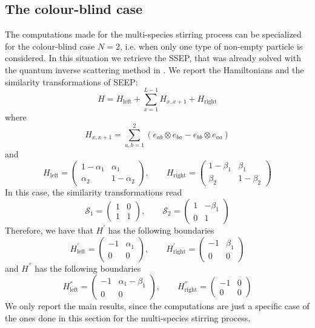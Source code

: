 \documentclass[10pt]{article}
\numberwithin{equation}{section}
\numberwithin{equation}{subsection}
\begin{document}
\subsection{The colour-blind case}
The computations made for the multi-species stirring process can be specialized for the colour-blind case $N=2$, i.e. when only one type of non-empty particle is considered. In this situation we retrieve the SSEP, that was already solved with the quantum inverse scattering method in \cite{frassek2020eigenstates}. We report the Hamiltonians and the similarity transformations of SEEP: 
\begin{equation}
	H=H_{\text{left}}+\sum_{x=1}^{L-1}H_{x,x+1}+H_{\text{right}}
\end{equation}
where 
\begin{equation}
	H_{x,x+1}=\sum_{a,b=1}^{2}\left(e_{ab}\otimes e_{ba}-e_{bb}\otimes e_{aa}\right)
\end{equation}
and 
\begin{equation}
	H_{\text{left}}=\begin{pmatrix}
		1-\alpha_{1}&\alpha_{1}\\
		\alpha_{2}&1-\alpha_{2}
	\end{pmatrix},\qquad H_{\text{right}}=\begin{pmatrix}
	1-\beta_{1}&\beta_{1}\\
	\beta_{2}&1-\beta_{2}
\end{pmatrix}
\end{equation}
In this case, the similarity transformations read
\begin{equation}
	\mathcal{S}_{1}=\begin{pmatrix}
		1&0\\
		1&1
	\end{pmatrix},\qquad \mathcal{S}_{2}=\begin{pmatrix}
	1&-\beta_{1}\\
	0&1
\end{pmatrix}
\end{equation}
Therefore, we have that $H^{'}$ has the following boundaries
\begin{equation}
	H^{'}_{\text{left}}=\begin{pmatrix}
		-1&\alpha_{1}\\
		0&0
	\end{pmatrix},\qquad H^{'}_{\text{right}}=\begin{pmatrix}
	-1&\beta_{1}\\
	0&0
\end{pmatrix}
\end{equation}
and $H^{''}$ has the following boundaries 
\begin{equation}
	H^{''}_{\text{left}}=\begin{pmatrix}
		-1&\alpha_{1}-\beta_{1}\\
		0&0
	\end{pmatrix},\qquad H^{''}_{\text{right}}=\begin{pmatrix}
	-1&0\\
	0&0
\end{pmatrix}
\end{equation}
 We only report the main results, since the computations are just a specific case of the ones done in this section for the multi-species stirring process. 
\end{document}
